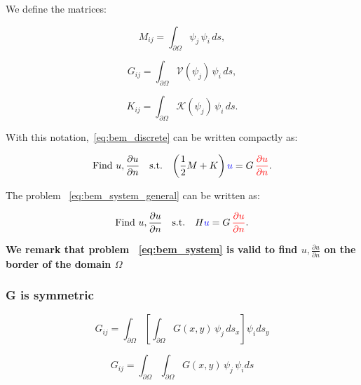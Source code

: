 \documentclass[11pt,onecolumn]{article}
\begin{document}
We define the matrices:

\begin{equation}
M_{ij} = \int_{\partial\Omega} \psi_j\, \psi_i\, ds,
\end{equation}

\begin{equation}
G_{ij} = \int_{\partial\Omega} \mathcal{V}(\psi_j)\, \psi_i\, ds,
\end{equation}

\begin{equation}
K_{ij} = \int_{\partial\Omega} \mathcal{K}(\psi_j)\, \psi_i\, ds.
\end{equation}

With this notation,~\eqref{eq:bem_discrete} can be written compactly as:

\begin{equation}
\begin{aligned}
&\text{Find } u,\frac{\partial u}{\partial n} \quad \text{s.t.}
&\left(\frac{1}{2}M + K\right) {\color{blue} u} = G\, {\color{red}\frac{\partial u}{\partial n}}.
\end{aligned}
\label{eq:bem_system_general}
\end{equation}

The problem ~\eqref{eq:bem_system_general} can be written as:

\begin{equation}
\begin{aligned}
&\text{Find } u,\frac{\partial u}{\partial n} \quad \text{s.t.}
&H{\color{blue} u} = G\, {\color{red}\frac{\partial u}{\partial n}}.
\end{aligned}
\label{eq:bem_system}
\end{equation}

\textbf{We remark that problem ~\eqref{eq:bem_system} is valid to find $u,\frac{\partial u}{\partial n} $ on the border of the domain $\Omega$}

\subsubsection{G is symmetric}
\begin{equation}
G_{ij} = \int_{\partial\Omega} \left[ \int_{\partial\Omega} G(x,y)\, 
\psi_j\, ds_x \right] \psi_ids_y
\label{eq:bem_G_sym_step_1}
\end{equation}

\begin{equation}
G_{ij} = \int_{\partial\Omega} \int_{\partial\Omega} G(x,y)\, 
\psi_j\, \psi_ids
\label{eq:bem_G_sym_step_2}
\end{equation}
\end{document}
